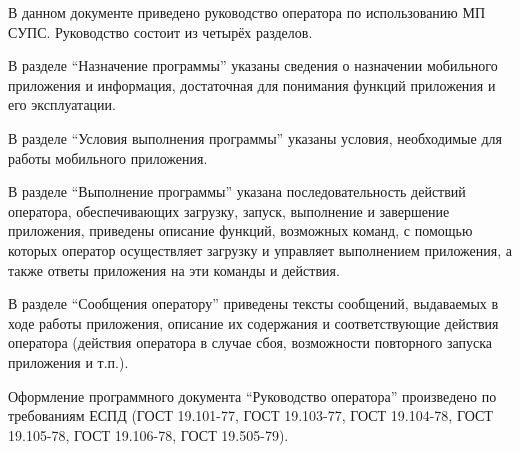 \Annotation

В данном документе приведено руководство оператора по использованию МП СУПС.
Руководство состоит из четырёх разделов.

В разделе ``Назначение программы'' указаны сведения о назначении мобильного приложения и информация, достаточная для понимания функций приложения и его эксплуатации.

В разделе ``Условия выполнения программы'' указаны условия, необходимые для работы мобильного приложения.

В разделе ``Выполнение программы'' указана последовательность действий оператора, обеспечивающих загрузку, запуск, выполнение и завершение приложения, приведены описание функций, возможных команд, с помощью которых оператор осуществляет загрузку и управляет выполнением приложения, а также ответы приложения на эти команды и действия.

В разделе ``Сообщения оператору'' приведены тексты сообщений, выдаваемых в ходе работы приложения, описание их содержания и соответствующие действия оператора (действия оператора в случае сбоя, возможности повторного запуска приложения и т.п.).

Оформление программного документа ``Руководство оператора'' произведено по требованиям ЕСПД (ГОСТ 19.101-77, ГОСТ 19.103-77, ГОСТ 19.104-78, ГОСТ 19.105-78, ГОСТ 19.106-78, ГОСТ 19.505-79).
